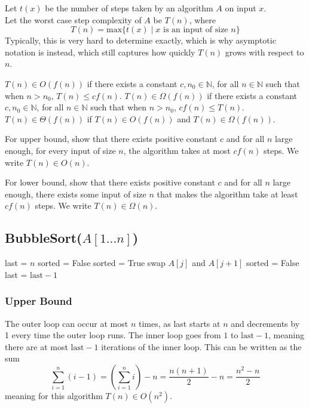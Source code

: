 Let $t(x)$ be the number of steps taken by an algorithm $A$ on input $x$. \\
Let the worst case step complexity of $A$ be $T(n)$, where
\[
T(n) = \text{max}\{ t(x) \mid x \text{ is an input of size } n \}
\]
Typically, this is very hard to determine exactly, which is why asymptotic notation is instead, which still captures how quickly $T(n)$ grows with respect to $n$. 

$T(n) \in O(f(n))$ if there exists a constant $c, n_0 \in \mathbb{N}$, for all $n \in \mathbb{N}$ such that when $n > n_0$, $T(n) \leq c f(n)$.
$T(n) \in \Omega(f(n))$ if there exists a constant $c, n_0 \in \mathbb{N}$, for all $n \in \mathbb{N}$ such that when $n > n_0$, $c f(n) \leq T(n)$.
$T(n) \in \Theta(f(n))$ if $T(n) \in O(f(n))$ and $T(n) \in \Omega(f(n))$.

For upper bound, show that there exists positive constant $c$ and for all $n$ large enough, for every input of size $n$, the algorithm takes at most $cf(n)$ steps. We write $T(n) \in O(n)$.

For lower bound, show that there exists positive constant $c$ and for all $n$ large enough, there exists some input of size $n$ that makes the algorithm take at least $cf(n)$ steps. We write $T(n) \in \Omega(n)$.

\newpage
\subsection*{BubbleSort($A[1...n]$)}
\begin{algorithmic}[1]
\State last = $n$ 
\State sorted = False
    \State sorted = True
            \State swap $A[j]$ and $A[j+1]$
            \State sorted = False
        \EndIf
    \EndFor
    \State last = $\text{last} - 1$
\EndWhile
\end{algorithmic}

\subsubsection*{Upper Bound}

The outer loop can occur at most $n$ times, as last starts at $n$ and decrements by 1 every time the outer loop runs. The inner loop goes from $1$ to $\text{last} - 1$, meaning there are at most $\text{last} - 1$ iterations of the inner loop. This can be written as the sum
\[
\sum_{i=1}^{n} (i-1) = \left(\sum_{i=1}^{n} i\right) - n = \frac{n(n+1)}{2} - n = \frac{n^2 - n}{2}
\]
meaning for this algorithm $T(n) \in O(n^2)$.

